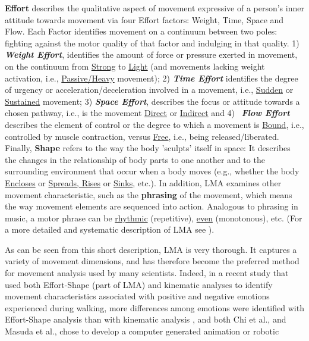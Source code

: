 \textbf{Effort} describes the qualitative aspect of movement expressive of a
person's inner attitude
towards movement via four Effort factors: Weight, Time, Space and Flow. Each
Factor identifies movement on a continuum between two poles: fighting against
the motor quality of that factor and indulging in that quality. 
1) \textbf{\textit{Weight Effort}}, identifies the amount of force or pressure
exerted in movement, on the continuum from \underline{Strong} to \underline{Light} (and
movements lacking weight activation, i.e., \underline{Passive/Heavy} movement); 
2) \textbf{\textit{Time Effort}} identifies the degree of urgency or
acceleration/deceleration involved in a movement, i.e., \underline{Sudden} or
\underline{Sustained} movement; 
3) \textbf{\textit{Space Effort}}, describes the focus or
attitude towards a chosen pathway, i.e., is the movement \underline{Direct} or
\underline{Indirect} and 
4)~ \textbf{\textit{Flow Effort}} describes the element of control or
the degree to which a movement is \underline{Bound}, i.e., controlled by muscle
contraction, versus \underline{Free}, i.e., being released/liberated.
Finally, \textbf{Shape} refers to the way the body 'sculpts' itself in space: It
describes the changes in the relationship of body parts to one another and to
the surrounding environment that occur when a body moves (e.g., whether the body
\underline{Encloses} or \underline{Spreads, Rises} or \underline{Sinks}, etc.).
In addition, LMA examines other movement characteristic, such as the
\textbf{phrasing} of the movement, which means the
way movement elements are sequenced into action. Analogous to phrasing in music,
a motor phrase can be \underline{rhythmic} (repetitive), \underline{even}
(monotonous), etc.
(For a more detailed and systematic description of LMA see
\cite{bartenieff1980body,studd, fernandes2014moving}).
\par As can be seen from this short description, LMA is very thorough. It
captures a variety of movement dimensions, and has therefore become the preferred method
for movement analysis used by many scientists. Indeed, in a recent study that
used both Effort-Shape (part of LMA) and kinematic analyses to identify movement
characteristics associated with positive and negative emotions experienced
during walking, more differences among emotions were identified with
Effort-Shape analysis than with kinematic analysis \cite{gross2012effort} , and
both Chi et al.,\cite{chi2000emote} and Masuda et al.,\cite{masuda2010motion}
chose to develop a computer generated animation \cite{chi2000emote} or robotic
